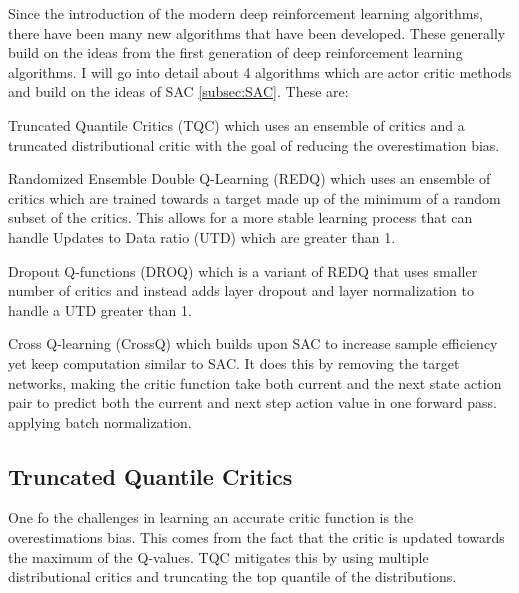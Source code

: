 Since the introduction of the modern deep reinforcement learning algorithms, there have been many new algorithms that have been developed. These generally build on the ideas from the first generation of deep reinforcement learning algorithms. I will go into detail about 4 algorithms which are actor critic methods and build on the ideas of SAC \ref{subsec:SAC}. These are:

\begin{description}
    \item{Truncated Quantile Critics (TQC) \cite{kuznetsovControllingOverestimationBias2020} which uses an ensemble of critics and a truncated distributional critic with the goal of reducing the overestimation bias.}
    \item{Randomized Ensemble Double Q-Learning (REDQ) \cite{chenRandomizedEnsembledDouble2021} which uses an ensemble of critics which are trained towards a target made up of the minimum of a random subset of the critics. This allows for a more stable learning process that can handle Updates to Data ratio (UTD) which are greater than 1.}
    \item{Dropout Q-functions (DROQ) \cite{hiraokaDropoutQFunctionsDoubly2022} which is a variant of REDQ that uses smaller number of critics and instead adds layer dropout and layer normalization to handle a UTD greater than 1.}
    \item{Cross Q-learning (CrossQ) \cite{bhattCrossQBatchNormalization2024} which builds upon SAC to increase sample efficiency yet keep computation similar to SAC. It does this by removing the target networks, making the critic function take both current and the next state action pair to predict both the current and next step action value in one forward pass. applying batch normalization.}

\end{description}

\subsection{Truncated Quantile Critics}\label{subsec:TQC}

One fo the challenges in learning an accurate critic function is the overestimations bias. This comes from the fact that the critic is updated towards the maximum of the Q-values. TQC \cite{kuznetsovControllingOverestimationBias2020} mitigates this by using multiple distributional critics and truncating the top quantile of the distributions.

